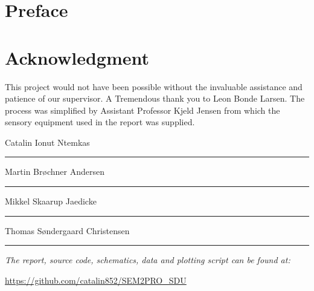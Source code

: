 \section*{Preface}

\section*{Acknowledgment}
This project would not have been possible without the invaluable assistance and patience of our supervisor. 
A Tremendous thank you to Leon Bonde Larsen.
The process was simplified by Assistant Professor Kjeld Jensen from which the sensory equipment used in the report was supplied.
\vspace{5cm}
\begin{center}
	\begin{minipage}[t]{.55\textwidth}\large
		\begin{center}
		Catalin Ionut Ntemkas\\
		\vspace{1cm}
		\hrule
		\vspace{0.5cm}
		Martin Brøchner Andersen\\
		\vspace{1cm}
		\hrule
		\vspace{0.5cm}
		Mikkel Skaarup Jaedicke\\
		\vspace{1cm}
		\hrule
		\vspace{0.5cm}
		Thomas Søndergaard Christensen
		\vspace{1cm}
		\hrule
		\end{center} 
	\end{minipage}
\end{center}

\vspace{1.2cm}
  \begin{center}
    \textsl{The report, source code, schematics, data and plotting script can be found at:}  
    \end{center}
    \vspace{-5pt}
    \begin{center}
	\renewcommand{\UrlFont}{\color{black}\normalsize\tt}
    \url{https://github.com/catalin852/SEM2PRO_SDU}
   \end{center}
\newpage

